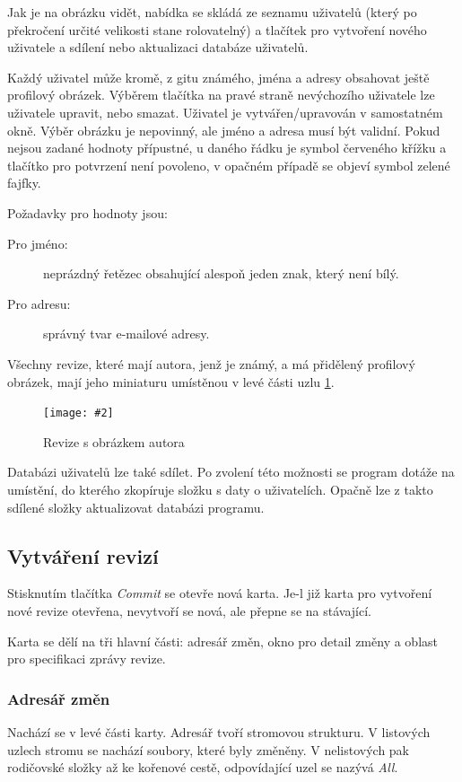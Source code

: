 \documentclass[
  biblatex,
  glossaries,
  index
]{kidiplom}
\newcommand{\pic}[4]{
\begin{figure}[h]
\centering
\texttt{[image: \#2]}
\caption{#3}
\label{fig:#4}
\end{figure}}
\begin{document}
Jak je na obrázku vidět, nabídka se skládá ze seznamu uživatelů (který po překročení určité velikosti stane rolovatelný) a tlačítek pro vytvoření nového uživatele a sdílení nebo aktualizaci databáze uživatelů.

Každý uživatel může kromě, z gitu známého, jména a adresy obsahovat ještě profilový obrázek. Výběrem tlačítka na pravé straně nevýchozího uživatele lze uživatele upravit, nebo smazat. Uživatel je vytvářen/upravován v samostatném okně. Výběr obrázku je nepovinný, ale jméno a adresa musí být validní. Pokud nejsou zadané hodnoty přípustné, u daného řádku je symbol červeného křížku a tlačítko pro potvrzení není povoleno, v opačném případě se objeví symbol zelené fajfky.

Požadavky pro hodnoty jsou:
\begin{description}
\item[Pro jméno:] neprázdný řetězec obsahující alespoň jeden znak, který není bílý.
\item[Pro adresu:] správný tvar e-mailové adresy.
\end{description}

Všechny revize, které mají autora, jenž je známý, a má přidělený profilový obrázek, mají jeho miniaturu umístěnou v levé části uzlu \ref{fig:user}.

\pic{10cm}{user.png}{Revize s obrázkem autora}{user}

Databázi uživatelů lze také sdílet. Po zvolení této možnosti se program dotáže na umístění, do kterého zkopíruje složku s daty o uživatelích. Opačně lze z takto sdílené složky aktualizovat databázi programu.

\subsection{Vytváření revizí}
Stisknutím tlačítka {\it Commit} se otevře nová karta. Je-l již karta pro vytvoření nové revize otevřena, nevytvoří se nová, ale přepne se na stávající.

Karta se dělí na tři hlavní části: adresář změn, okno pro detail změny a oblast pro specifikaci zprávy revize.

\subsubsection{Adresář změn}
Nachází se v levé části karty. Adresář tvoří stromovou strukturu. V listových uzlech stromu se nachází soubory, které byly změněny. V nelistových pak rodičovské složky až ke kořenové cestě, odpovídající uzel se nazývá {\it All}.
\end{document}
